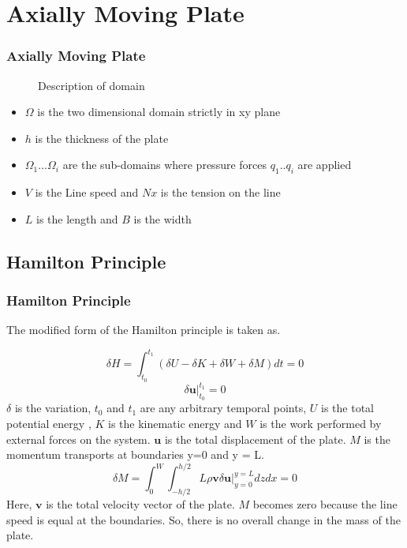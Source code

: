 \documentclass[9pt]{beamer}
\begin{document}
\section{Axially Moving Plate}
\begin{frame}\frametitle{Axially Moving Plate}

\begin{figure}[ht!]
\centering
\caption{Description of domain}
\label{fig:Domain}
\end{figure}
\begin{itemize}

\item $\Omega$ is the two dimensional domain strictly in xy plane 
\item $h$ is the thickness of the plate 
\item $\Omega_1$...$\Omega_i$ are the sub-domains where pressure forces $q_1$..$q_i$ are applied
\item $V$ is the Line speed and  $Nx$ is the tension on the line
\item $L$ is the length and  $B$ is the width 

\end{itemize}




\end{frame}

\subsection{Hamilton Principle}


\begin{frame}\frametitle{Hamilton Principle}

The modified form of the Hamilton principle is taken as.

 \begin{equation}\label{eq:HAM_P}
 \delta H=\int_{t_0}^{t_1} \left( \delta U - \delta K + \delta W + \delta M \right) dt  = 0  
 \end{equation}
 \begin{equation}\label{eq:HAM_P_C}
  \delta \mathbf{u} \Big|_{t_0}^{t_1} = 0
 \end{equation}
 $\delta$ is the variation, $t_0$ and $t_1$ are any arbitrary temporal points, $U$ is the total potential energy , $K$ is the kinematic energy and $W$ is the work performed by external forces on the system. $\mathbf{u}$ is the total displacement of the plate. $M$ is the momentum transports at boundaries y=0 and y = L. 
 \begin{equation}\label{eq:vr_M}
\delta M= \int_{0}^{W} \int_{-h/2}^{h/2}L \rho \mathbf{v} \delta \mathbf{u} \Big|_{y=0}^{y=L} dz dx  = 0
 \end{equation}
Here, $\mathbf{v}$ is the total velocity vector of the plate. $M$ becomes zero because the line speed is equal at the boundaries. So, there is no overall change in the mass of the plate.
\end{frame}
\end{document}

